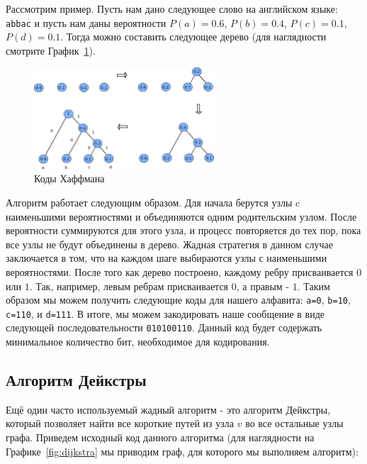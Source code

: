 Рассмотрим пример. Пусть нам дано следующее слово на английском
языке: \texttt{abbac} и пусть нам даны вероятности $P(a)=0.6$, 
$P(b)=0.4$, $P(c)=0.1$, $P(d)=0.1$. Тогда можно составить следующее 
дерево (для наглядности смотрите График~\ref{fig:huffman}). 

\begin{figure}
\centering
\includegraphics[width=0.6\textwidth]{graphics/huffman.png}
\caption{Коды Хаффмана}
\label{fig:huffman}
\end{figure}

Алгоритм работает следующим образом. Для начала берутся 
узлы c наименьшими вероятностями и объединяются одним родительским узлом.
После вероятности суммируются для этого узла, и процесс повторяется до тех
пор, пока все узлы не будут объединены в дерево. Жадная стратегия 
в данном случае заключается в том, что на каждом шаге выбираются
узлы с наименьшими вероятностями. После того как дерево построено,
каждому ребру присваивается $0$ или $1$. Так, например, левым ребрам
присваивается $0$, а правым - $1$. Таким образом мы можем получить следующие
коды для нашего алфавита: \texttt{a=0}, \texttt{b=10}, \texttt{c=110}, и
\texttt{d=111}. В итоге, мы можем закодировать наше сообщение в виде следующей 
последовательности \texttt{010100110}. Данный код будет содержать 
минимальное количество бит, необходимое для кодирования.


\subsection{Алгоритм Дейкстры}
Ещё один часто используемый жадный алгоритм - это алгоритм Дейкстры, который позволяет
найти все короткие путей из узла $v$ во все остальные узлы графа. Приведем
исходный код данного алгоритма (для наглядности на Графике~\ref{fig:dijkstra}
мы приводим граф, для которого мы выполняем алгоритм):

